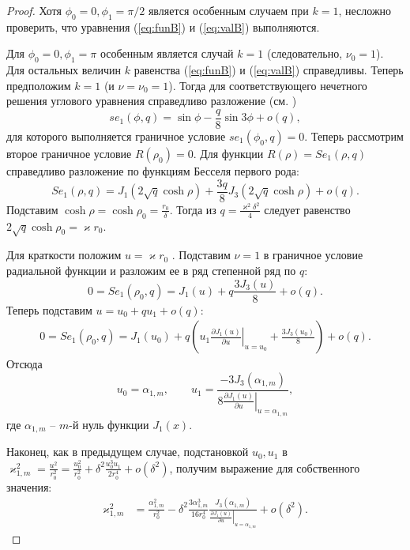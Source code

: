 \begin{proof}
Хотя $\phi_0=0, \phi_1=\pi/2$ является особенным случаем при $k=1$,
несложно проверить, что уравнения (\ref{eq:funB}) и (\ref{eq:valB}) выполняются.

Для  $\phi_0=0, \phi_1=\pi$
особенным является случай  $k=1$ (следовательно, $\nu_0=1$). 
Для остальных величин $k$ равенства (\ref{eq:funB}) и (\ref{eq:valB}) справедливы.
Теперь предположим $k=1$ (и $\nu=\nu_0 = 1$).
Тогда для соответствующего нечетного решения углового уравнения справедливо разложение  (см. \cite[Subsect.~20.2.27]{wref2})
\begin{equation*}
se_1(\phi, q) = 	\sin{\phi}  - 	\frac{q}{8} \sin{3\phi} + o(q),
 \end{equation*}
для которого выполняется граничное условие $se_1(\phi_0, q)=0$. 
Теперь рассмотрим второе граничное условие $R(\rho_0) = 0$. 
Для функции $R(\rho) = Se_1(\rho, q)$ справедливо разложение по функциям Бесселя первого рода:
\begin{equation*}
Se_1(\rho, q) = J_1(2\sqrt{q} \cosh{\rho}) + \frac{3 q}{8} J_3(2\sqrt{q}\cosh{\rho}) + o(q).
\end{equation*}
Подставим $\cosh \rho = \cosh \rho_0 =\frac{r_0}{\delta}$.
Тогда из $q = \frac{\varkappa^2 \delta^2}{4}$ следует равенство
$2\sqrt{q} \cosh{\rho_0} =  \varkappa r_0$.

Для краткости положим $u = \varkappa r_0$ .
Подставим $\nu = 1$ в граничное условие радиальной функции и разложим ее в ряд степенной ряд по $q$:
\begin{equation*}
    0 = Se_1(\rho_0, q) = 
    J_1(u) + q  \frac{3 J_3(u)}{8} + o(q).
\end{equation*}
Теперь подставим $u = u_0 + q u_1 + o(q)$:
\begin{align*}
    0 = Se_1(\rho_0, q) =    J_1(u_0) + q \left( 
    u_1 \left.\frac{\partial J_1 (u)}{\partial u}\right|_{u=u_0}
    + \frac{3 J_3(u_0)}{8}
    \right) + o(q).
\end{align*}
Отсюда 
\begin{equation*}
u_0 = \alpha_{1, m}, \qquad u_1 = 
\frac{ - 3 J_3(\alpha_{1, m}) }{8\left.
\frac{\partial J_1 (u)}{\partial u}\right|_{u=\alpha_{1, m}}},
\end{equation*}
где $\alpha_{1, m}$ -- $m$-й нуль функции $J_1(x)$. 

Наконец, как в предыдущем случае, подстановкой $u_0, u_1$ в $\varkappa_{1, m}^2 = \frac{u^2}{r_0^2} = \frac{u_0^2}{r_0^2} + \delta^2 \frac{u_0^3 u_1}{2r_0^4} + o(\delta^2)$, получим выражение для собственного значения:
\begin{align}
    \varkappa_{1, m}^2& = \frac{\alpha_{1, m}^2}{r_0^2} - \delta^2 \frac{3\alpha_{1, m}^3}{16r_0^4} 
    \frac{J_3(\alpha_{1, m})}{\left.\frac{\partial J_1 (u)}{\partial u}\right|_{u=\alpha_{1, m}}} 
    + o(\delta^2).  \label{eq:valS2}
\end{align}

\end{proof}
